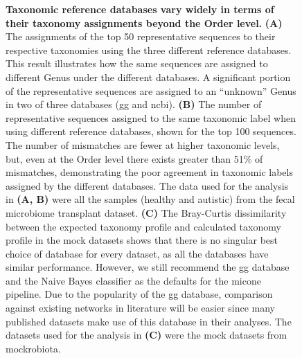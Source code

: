   \begin{figure}[H]
    \centering
    \caption{
      \textbf{Taxonomic reference databases vary widely in terms of their taxonomy assignments beyond the Order level.}
      \textbf{(A)} The assignments of the top 50 representative sequences to their respective taxonomies using the three different reference databases.
      This result illustrates how the same sequences are assigned to different Genus under the different databases.
      A significant portion of the representative sequences are assigned to an ``unknown'' Genus in two of three databases (\ac{gg} and \ac{ncbi}).
      \textbf{(B)} The number of representative sequences assigned to the same taxonomic label when using different reference databases, shown for the top 100 sequences.
      The number of mismatches are fewer at higher taxonomic levels, but, even at the Order level there exists greater than 51\% of mismatches, demonstrating the poor agreement in taxonomic labels assigned by the different databases.
      The data used for the analysis in \textbf{(A, B)} were all the samples (healthy and autistic) from the fecal microbiome transplant dataset.
      \textbf{(C)} The Bray-Curtis dissimilarity between the expected taxonomy profile and calculated taxonomy profile in the mock datasets shows that there is no singular best choice of database for every dataset, as all the databases have similar performance.
      However, we still recommend the \ac{gg} database and the Naive Bayes classifier as the defaults for the \ac{micone} pipeline.
      Due to the popularity of the \ac{gg} database, comparison against existing networks in literature will be easier since many published datasets make use of this database in their analyses.
      The datasets used for the analysis in \textbf{(C)} were the mock datasets from mockrobiota.
    }
    \label{fig:figure3}
  \end{figure}


